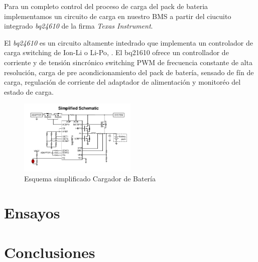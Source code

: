 \documentclass[10pt,a4paper]{article}
\begin{document}

    Para un completo control del proceso de carga del pack de bateria implementamos un circuito de carga en nuestro \acrshort{BMS} a partir del ciucuito integrado \emph{bq24610} de la firma \emph{Texas Instrument}.

    El \emph{bq24610} es un circuito altamente intedrado que implementa un controlador  de carga switching de \acrfull{Ion-Li} o \acrfull{Li-Po}, .
    El bq21610 ofrece un controllador de corriente y de tensión sincrónico switching PWM de frecuencia constante de alta resolución, carga de pre acondicionamiento del pack de batería, sensado de fín de carga, regulación de corriente del adaptador de alimentación y monitoréo del estado de carga. 

    \begin{figure}[h!]
        \centering
        \includegraphics[width=0.5\textwidth]{bat_char/simp_sch_char.png}
        \caption{Esquema simplificado Cargador de Batería}
        \label{fig:simp_sch_char}
    \end{figure}
    \FloatBarrier
    
    \section{Ensayos}\label{ensayos}
    \newpage

    \section{Conclusiones}\label{conclusiones}
    \printbibliography
    \newpage
    \glsaddall
    \printnoidxglossary[type=\acronymtype,title={Abreviaturas}]
\end{document}
